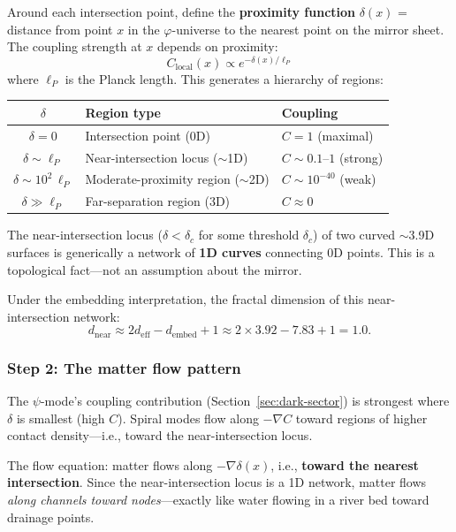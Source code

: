 \documentclass[12pt,a4paper]{article}
\begin{document}
Around each intersection point, define the \textbf{proximity function} $\delta(x)$ = distance from point $x$ in the $\varphi$-universe to the nearest point on the mirror sheet. The coupling strength at $x$ depends on proximity:
\begin{equation}
C_{\mathrm{local}}(x) \propto e^{-\delta(x)/\ell_P}
\end{equation}
where $\ell_P$ is the Planck length. This generates a hierarchy of regions:
\begin{center}
\begin{tabular}{|c|l|l|}
\hline
$\delta$ & \textbf{Region type} & \textbf{Coupling} \\
\hline
$\delta = 0$ & Intersection point (0D) & $C = 1$ (maximal) \\
$\delta \sim \ell_P$ & Near-intersection locus ($\sim$1D) & $C \sim 0.1\text{--}1$ (strong) \\
$\delta \sim 10^2\,\ell_P$ & Moderate-proximity region ($\sim$2D) & $C \sim 10^{-40}$ (weak) \\
$\delta \gg \ell_P$ & Far-separation region (3D) & $C \approx 0$ \\
\hline
\end{tabular}
\end{center}

\noindent The near-intersection locus ($\delta < \delta_c$ for some threshold $\delta_c$) of two curved $\sim$3.9D surfaces is generically a network of \textbf{1D curves} connecting 0D points. This is a topological fact---not an assumption about the mirror.

Under the embedding interpretation, the fractal dimension of this near-intersection network:
\begin{equation}
d_{\mathrm{near}} \approx 2d_{\mathrm{eff}} - d_{\mathrm{embed}} + 1 \approx 2 \times 3.92 - 7.83 + 1 = 1.0.
\end{equation}

\subsubsection{Step 2: The matter flow pattern}

The $\psi$-mode's coupling contribution (Section~\ref{sec:dark-sector}) is strongest where $\delta$ is smallest (high $C$).  Spiral modes flow along $-\nabla C$ toward regions of higher contact density---i.e., toward the near-intersection locus.

The flow equation: matter flows along $-\nabla \delta(x)$, i.e., \textbf{toward the nearest intersection}. Since the near-intersection locus is a 1D network, matter flows \emph{along channels toward nodes}---exactly like water flowing in a river bed toward drainage points.
\end{document}
